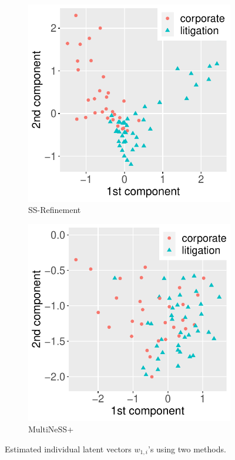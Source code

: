 \documentclass[12pt]{article}
\begin{document}
\begin{figure}
\centering
\begin{subfigure}{0.28\textwidth}
	\centering
	\includegraphics[width=1\linewidth]{Figures/Law_W1.pdf}
    \caption{SS-Refinement}
\end{subfigure}\quad 
\begin{subfigure}{0.28\textwidth}
	\centering
	\includegraphics[width=1\linewidth]{Figures/Lawp_W1.pdf}
    \caption{MultiNeSS+}
\end{subfigure}
\caption{Estimated individual latent vectors $w_{1,i}$'s  using two methods.}
\label{fig:estW1}
\end{figure}
\end{document}
